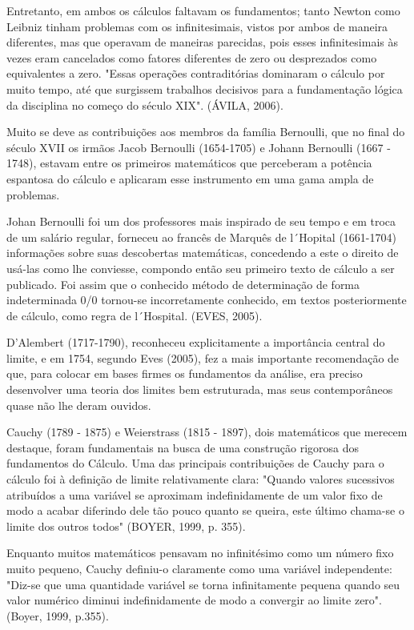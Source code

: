 \documentclass{article}
\begin{document}
\medskip
Entretanto, em ambos os cálculos faltavam os fundamentos; tanto
Newton como Leibniz tinham problemas com os infinitesimais, vistos
por ambos de maneira diferentes, mas que operavam de maneiras
parecidas, pois esses infinitesimais às vezes eram cancelados como
fatores diferentes de zero ou desprezados como equivalentes a zero.
"Essas operações contraditórias dominaram o cálculo por muito tempo,
até que surgissem trabalhos decisivos para a fundamentação lógica da
disciplina no começo do século XIX". (ÁVILA, 2006).

\medskip
 Muito se deve as
contribuições aos membros da família Bernoulli, que no final do
século XVII os irmãos Jacob Bernoulli (1654-1705) e Johann Bernoulli
(1667 - 1748), estavam entre os primeiros matemáticos que perceberam
a potência espantosa do cálculo e aplicaram esse instrumento em uma
gama ampla de problemas.

\medskip
 Johan Bernoulli foi um dos professores mais
inspirado de seu tempo e em troca de um salário regular, forneceu ao
francês de Marquês de l´Hopital (1661-1704) informações sobre suas
descobertas matemáticas, concedendo a este o direito de usá-las como
lhe conviesse, compondo então seu primeiro texto de cálculo a ser
publicado. Foi assim que o conhecido método de determinação de forma
indeterminada 0/0 tornou-se incorretamente conhecido, em textos
posteriormente de cálculo, como regra de l´Hospital. (EVES, 2005).

\medskip
D'Alembert (1717-1790), reconheceu explicitamente a importância
central do limite, e em 1754, segundo Eves (2005), fez a mais
importante recomendação de que, para colocar em bases firmes os
fundamentos da análise, era preciso desenvolver uma teoria dos
limites bem estruturada, mas seus contemporâneos quase não lhe deram
ouvidos.

\medskip
Cauchy (1789 - 1875) e Weierstrass (1815 - 1897), dois matemáticos
que merecem destaque, foram fundamentais na busca de uma construção
rigorosa dos fundamentos do Cálculo. Uma das principais
contribuições de Cauchy para o cálculo foi à definição de limite
relativamente clara: "Quando valores sucessivos atribuídos a uma
variável se aproximam indefinidamente de um valor fixo de modo a
acabar diferindo dele tão pouco quanto se queira, este último
chama-se o limite dos outros todos" (BOYER, 1999, p. 355).

\medskip
 Enquanto muitos
matemáticos pensavam no infinitésimo como um número fixo muito
pequeno, Cauchy definiu-o claramente como uma variável independente:
"Diz-se que uma quantidade variável se torna infinitamente pequena
quando seu valor numérico diminui indefinidamente de modo a
convergir ao limite zero". (Boyer, 1999, p.355).
\end{document}
